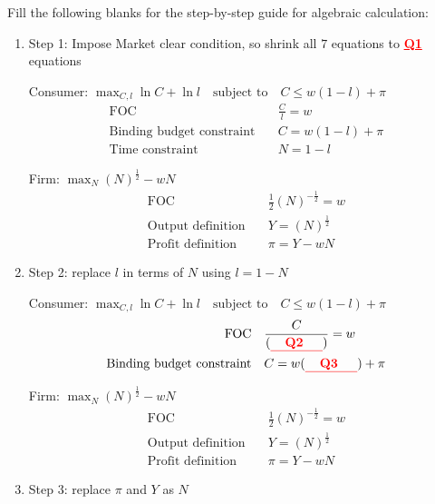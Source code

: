 \documentclass[14pt]{extarticle}
\newcommand{\red}[1]{\textcolor{red}{#1}}
\begin{document}
Fill the following blanks for the step-by-step guide for algebraic calculation:

\begin{enumerate}
    \item Step 1: Impose Market clear condition, so shrink all $ 7 $ equations to \textbf{\red{\underline{\quad Q1 \quad}}} equations

    Consumer: $ \max_{C, l} \ln C + \ln l \quad \text{subject to} \quad C \le w( 1-l ) + \pi $
    \begin{align}
        \text{FOC} \quad
            & \frac{C}{l} = w
            \label{eq:consumerFOC}
        \\
        \text{Binding budget constraint} \quad
            & C = w ( 1-l ) + \pi
            \label{eq:binding_budget}
        \\
        \text{Time constraint} \quad
            & N = 1 - l
            \label{eq:time_budget}
    \end{align}

    Firm: $ \max_{N} ( N )^{\frac{1}{2}} - w N $
    \begin{align}
        \text{FOC} \quad
            & \frac{1}{2} ( N )^{- \frac{1}{2}} = w
            \label{eq:firmFOC}
        \\
        \text{Output definition} \quad
            & Y = ( N )^{\frac{1}{2}}
            \label{eq:outputDef}
        \\
        \text{Profit definition} \quad
            & \pi = Y - w N
            \label{eq:profitDef}
    \end{align}
    \item Step 2: replace $ l $ in terms of $ N $ using $ l = 1-N $

    Consumer: $ \max_{C, l} \ln C + \ln l \quad \text{subject to} \quad C \le w( 1-l ) + \pi $
    \begin{align}
        \text{FOC} \quad
            & \frac{C}{(\textbf{\red{\underline{\quad Q2 \quad}}})} = w
            \label{eq:consumerFOC}
        \\
        \text{Binding budget constraint} \quad
            & C = w (\textbf{\red{\underline{\quad Q3 \quad}}}) + \pi
            \label{eq:binding_budget}
    \end{align}

    Firm: $ \max_{N} ( N )^{\frac{1}{2}} - w N $
    \begin{align}
        \text{FOC} \quad
            & \frac{1}{2} ( N )^{- \frac{1}{2}} = w
            \label{eq:firmFOC}
        \\
        \text{Output definition} \quad
            & Y = ( N )^{\frac{1}{2}}
            \label{eq:outputDef}
        \\
        \text{Profit definition} \quad
            & \pi = Y - w N
            \label{eq:profitDef}
    \end{align}
    \item Step 3: replace $ \pi $ and $ Y $ as $ N $


\end{enumerate}
\end{document}
